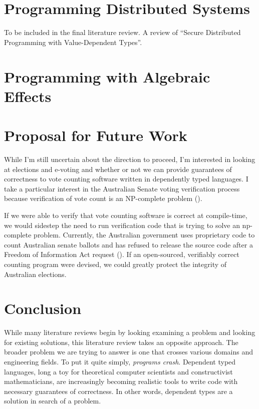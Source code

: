 \section{Programming Distributed Systems}

To be included in the final literature review. A review of ``Secure Distributed
Programming with Value-Dependent Types''. \cite{fstar_distributed_programming}

\section{Programming with Algebraic Effects}



\section{Proposal for Future Work}

While I'm still uncertain about the direction to proceed, I'm interested in
looking at elections and e-voting and whether or not we can provide guarantees
of correctness to vote counting software written in dependently typed languages.
I take a particular interest in the Australian Senate voting verification
process because verification of vote count is an NP-complete problem
(\cite{aus_senate}). 

If we were able to verify that vote counting software is correct at
compile-time, we would sidestep the need to run verification code that is trying
to solve an np-complete problem. Currently, the Australian government uses
proprietary code to count Australian senate ballots and has refused to release
the source code after a Freedom of Information Act request
(\cite{aus_senate_news}). If an open-sourced, verifiably correct counting
program were devised, we could greatly protect the integrity of Australian
elections. 

\section{Conclusion}
While many literature reviews begin by looking examining a problem and looking
for existing solutions, this literature review takes an opposite approach. The
broader problem we are trying to answer is one that crosses various domains and
engineering fields. To put it quite simply, \textit{programs crash}. Dependent
typed languages, long a toy for theoretical computer scientists and
constructivist mathematicians, are increasingly becoming realistic tools to
write code with necessary guarantees of correctness. In other words, dependent
types are a solution in search of a problem. 

